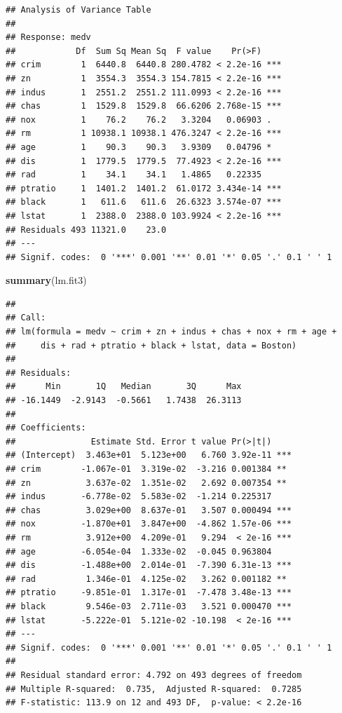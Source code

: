 \documentclass[]{book}
\newenvironment{Shaded}{\begin{snugshade}}{\end{snugshade}}
\newcommand{\KeywordTok}[1]{\textcolor[rgb]{0.13,0.29,0.53}{\textbf{#1}}}
\newcommand{\NormalTok}[1]{#1}
\theoremstyle{definition}
\theoremstyle{definition}
\theoremstyle{definition}
\theoremstyle{remark}
\begin{document}
\begin{verbatim}
## Analysis of Variance Table
## 
## Response: medv
##            Df  Sum Sq Mean Sq  F value    Pr(>F)    
## crim        1  6440.8  6440.8 280.4782 < 2.2e-16 ***
## zn          1  3554.3  3554.3 154.7815 < 2.2e-16 ***
## indus       1  2551.2  2551.2 111.0993 < 2.2e-16 ***
## chas        1  1529.8  1529.8  66.6206 2.768e-15 ***
## nox         1    76.2    76.2   3.3204   0.06903 .  
## rm          1 10938.1 10938.1 476.3247 < 2.2e-16 ***
## age         1    90.3    90.3   3.9309   0.04796 *  
## dis         1  1779.5  1779.5  77.4923 < 2.2e-16 ***
## rad         1    34.1    34.1   1.4865   0.22335    
## ptratio     1  1401.2  1401.2  61.0172 3.434e-14 ***
## black       1   611.6   611.6  26.6323 3.574e-07 ***
## lstat       1  2388.0  2388.0 103.9924 < 2.2e-16 ***
## Residuals 493 11321.0    23.0                       
## ---
## Signif. codes:  0 '***' 0.001 '**' 0.01 '*' 0.05 '.' 0.1 ' ' 1
\end{verbatim}

\begin{Shaded}
\begin{Highlighting}[]
\KeywordTok{summary}\NormalTok{(lm.fit3)}
\end{Highlighting}
\end{Shaded}

\begin{verbatim}
## 
## Call:
## lm(formula = medv ~ crim + zn + indus + chas + nox + rm + age + 
##     dis + rad + ptratio + black + lstat, data = Boston)
## 
## Residuals:
##      Min       1Q   Median       3Q      Max 
## -16.1449  -2.9143  -0.5661   1.7438  26.3113 
## 
## Coefficients:
##               Estimate Std. Error t value Pr(>|t|)    
## (Intercept)  3.463e+01  5.123e+00   6.760 3.92e-11 ***
## crim        -1.067e-01  3.319e-02  -3.216 0.001384 ** 
## zn           3.637e-02  1.351e-02   2.692 0.007354 ** 
## indus       -6.778e-02  5.583e-02  -1.214 0.225317    
## chas         3.029e+00  8.637e-01   3.507 0.000494 ***
## nox         -1.870e+01  3.847e+00  -4.862 1.57e-06 ***
## rm           3.912e+00  4.209e-01   9.294  < 2e-16 ***
## age         -6.054e-04  1.333e-02  -0.045 0.963804    
## dis         -1.488e+00  2.014e-01  -7.390 6.31e-13 ***
## rad          1.346e-01  4.125e-02   3.262 0.001182 ** 
## ptratio     -9.851e-01  1.317e-01  -7.478 3.48e-13 ***
## black        9.546e-03  2.711e-03   3.521 0.000470 ***
## lstat       -5.222e-01  5.121e-02 -10.198  < 2e-16 ***
## ---
## Signif. codes:  0 '***' 0.001 '**' 0.01 '*' 0.05 '.' 0.1 ' ' 1
## 
## Residual standard error: 4.792 on 493 degrees of freedom
## Multiple R-squared:  0.735,  Adjusted R-squared:  0.7285 
## F-statistic: 113.9 on 12 and 493 DF,  p-value: < 2.2e-16
\end{verbatim}
\end{document}

